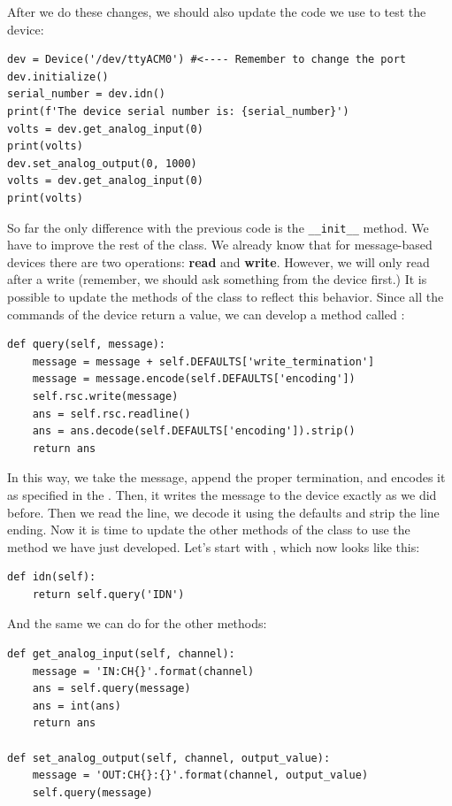 After we do these changes, we should also update the code we use to test the device:

\begin{verbatim}
dev = Device('/dev/ttyACM0') #<---- Remember to change the port
dev.initialize()
serial_number = dev.idn()
print(f'The device serial number is: {serial_number}')
volts = dev.get_analog_input(0)
print(volts)
dev.set_analog_output(0, 1000)
volts = dev.get_analog_input(0)
print(volts)
\end{verbatim}

\sloppy So far the only difference with the previous code is the \texttt{__init__} method. We have to improve the rest of the class. We already know that for message-based devices there are two operations: \textbf{read} and \textbf{write}. However, we will only read after a write (remember, we should ask something from the device first.) It is possible to update the methods of the class to reflect this behavior. Since all the commands of the device return a value, we can develop a method called :

\begin{verbatim}
def query(self, message):
    message = message + self.DEFAULTS['write_termination']
    message = message.encode(self.DEFAULTS['encoding'])
    self.rsc.write(message)
    ans = self.rsc.readline()
    ans = ans.decode(self.DEFAULTS['encoding']).strip()
    return ans
\end{verbatim}

In this way, we take the message, append the proper termination, and encodes it as specified in the . Then, it writes the message to the
device exactly as we did before. Then we read the line, we decode it using the defaults and strip the line ending. Now it is time to update the other methods of the class to use the  method we have just developed. Let's start with , which now looks like this:

\begin{verbatim}
def idn(self):
    return self.query('IDN')
\end{verbatim}

And the same we can do for the other methods:

\begin{verbatim}
def get_analog_input(self, channel):
    message = 'IN:CH{}'.format(channel)
    ans = self.query(message)
    ans = int(ans)
    return ans

def set_analog_output(self, channel, output_value):
    message = 'OUT:CH{}:{}'.format(channel, output_value)
    self.query(message)
\end{verbatim}

